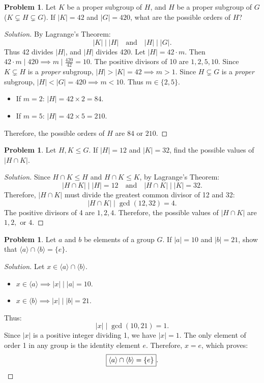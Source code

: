 \documentclass[12pt]{article}
\theoremstyle{definition}
\newtheorem{problem}[definition]{Problem}
\theoremstyle{plain}
\begin{document}
\begin{problem}
Let $K$ be a proper subgroup of $H$, and $H$ be a proper subgroup of $G$ ($K \subsetneq H \subsetneq G$). If $|K| = 42$ and $|G| = 420$, what are the possible orders of $H$?
\end{problem}
\begin{proof}[Solution]
By Lagrange's Theorem:
\[
|K| \mid |H| \quad \text{and} \quad |H| \mid |G|.
\]
Thus 42 divides $|H|$, and $|H|$ divides 420.
Let $|H| = 42 \cdot m$. Then $42 \cdot m \mid 420 \implies m \mid \frac{420}{42} = 10$.
The positive divisors of 10 are $1, 2, 5, 10$.
Since $K \subsetneq H$ is a \textit{proper} subgroup, $|H| > |K| = 42 \implies m > 1$.
Since $H \subsetneq G$ is a \textit{proper} subgroup, $|H| < |G| = 420 \implies m < 10$.
Thus $m \in \{2, 5\}$.
\begin{itemize}
    \item If $m = 2$: $|H| = 42 \times 2 = 84$.
    \item If $m = 5$: $|H| = 42 \times 5 = 210$.
\end{itemize}
Therefore, the possible orders of $H$ are $\boxed{84 \text{ or } 210}$.
\end{proof}

\begin{problem}
Let $H, K \le G$. If $|H| = 12$ and $|K| = 32$, find the possible values of $|H \cap K|$.
\end{problem}
\begin{proof}[Solution]
Since $H \cap K \le H$ and $H \cap K \le K$, by Lagrange's Theorem:
\[
|H \cap K| \mid |H| = 12 \quad \text{and} \quad |H \cap K| \mid |K| = 32.
\]
Therefore, $|H \cap K|$ must divide the greatest common divisor of 12 and 32:
\[
|H \cap K| \mid \gcd(12, 32) = 4.
\]
The positive divisors of 4 are $1, 2, 4$.
Therefore, the possible values of $|H \cap K|$ are $\boxed{1, 2, \text{ or } 4}$.
\end{proof}

\begin{problem}
Let $a$ and $b$ be elements of a group $G$. If $|a| = 10$ and $|b| = 21$, show that $\langle a \rangle \cap \langle b \rangle = \{e\}$.
\end{problem}
\begin{proof}[Solution]
Let $x \in \langle a \rangle \cap \langle b \rangle$.
\begin{itemize}
    \item $x \in \langle a \rangle \implies |x| \mid |a| = 10$.
    \item $x \in \langle b \rangle \implies |x| \mid |b| = 21$.
\end{itemize}
Thus:
\[
|x| \mid \gcd(10, 21) = 1.
\]
Since $|x|$ is a positive integer dividing 1, we have $|x| = 1$.
The only element of order 1 in any group is the identity element $e$.
Therefore, $x = e$, which proves:
\[
\boxed{\langle a \rangle \cap \langle b \rangle = \{e\}}. \qedhere
\]
\end{proof}
\end{document}
